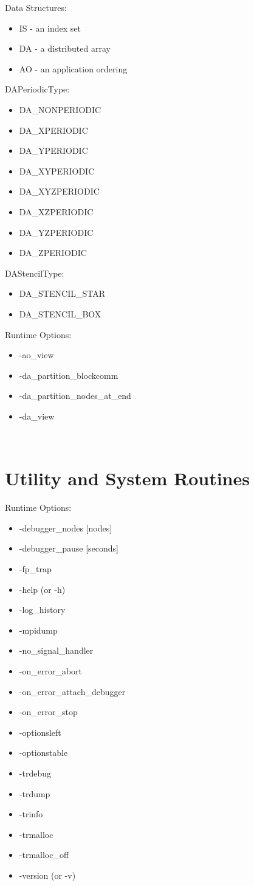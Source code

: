 \noindent
Data Structures:
\begin{itemize}
\item IS - an index set
\item DA - a distributed array
\item AO - an application ordering
\end{itemize}
DAPeriodicType:
\begin{itemize}
\item DA\_NONPERIODIC
\item  DA\_XPERIODIC
\item  DA\_YPERIODIC
\item  DA\_XYPERIODIC
\item  DA\_XYZPERIODIC
\item  DA\_XZPERIODIC
\item  DA\_YZPERIODIC
\item DA\_ZPERIODIC
\end{itemize}
DAStencilType:
\begin{itemize}
\item DA\_STENCIL\_STAR
\item DA\_STENCIL\_BOX 
\end{itemize}
Runtime Options:
\begin{itemize}
\item -ao\_view
\item -da\_partition\_blockcomm
\item -da\_partition\_nodes\_at\_end
\item -da\_view
\end{itemize}

 \\

{\small
\noindent

}

\section{Utility and System Routines}

\noindent
Runtime Options:
\begin{itemize}
\item -debugger\_nodes [nodes]
\item -debugger\_pause [seconds]
\item -fp\_trap
\item -help (or -h)
\item -log\_history
\item -mpidump
\item -no\_signal\_handler
\item -on\_error\_abort
\item -on\_error\_attach\_debugger
\item -on\_error\_stop
\item -optionsleft
\item -optionstable
\item -trdebug
\item -trdump
\item -trinfo
\item -trmalloc
\item -trmalloc\_off
\item -version (or -v)
\end{itemize}

